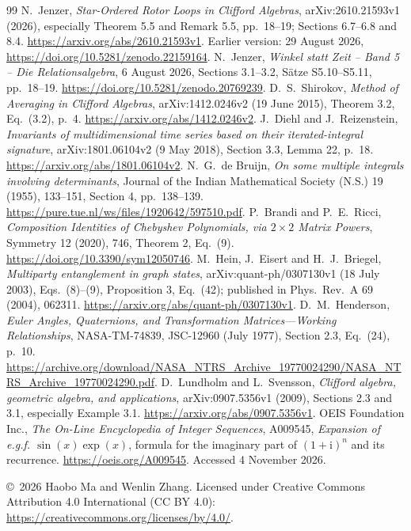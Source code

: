 \documentclass[11pt]{article}
\begin{document}
\begin{thebibliography}{99}\small
{} N.~Jenzer, \emph{Star-Ordered Rotor Loops in Clifford
Algebras}, arXiv:2610.21593v1 (2026), especially Theorem 5.5 and
Remark 5.5, pp.~18--19; Sections 6.7--6.8 and 8.4.
\url{https://arxiv.org/abs/2610.21593v1}. Earlier version:
29 August 2026, \url{https://doi.org/10.5281/zenodo.22159164}.
 N.~Jenzer, \emph{Winkel statt Zeit -- Band 5 --
Die Relationsalgebra}, 6 August 2026, Sections 3.1--3.2,
S\"atze S5.10--S5.11, pp.~18--19.
\url{https://doi.org/10.5281/zenodo.20769239}.
 D.~S.~Shirokov, \emph{Method of Averaging in Clifford
Algebras}, arXiv:1412.0246v2 (19 June 2015), Theorem 3.2, Eq.~(3.2), p.~4.
\url{https://arxiv.org/abs/1412.0246v2}.
 J.~Diehl and J.~Reizenstein, \emph{Invariants of multidimensional
time series based on their iterated-integral signature}, arXiv:1801.06104v2
(9 May 2018), Section 3.3, Lemma 22, p.~18.
\url{https://arxiv.org/abs/1801.06104v2}.
 N.~G.~de Bruijn, \emph{On some multiple integrals involving
determinants}, Journal of the Indian Mathematical Society (N.S.) 19
(1955), 133--151, Section 4, pp.~138--139.
\url{https://pure.tue.nl/ws/files/1920642/597510.pdf}.
 P.~Brandi and P.~E.~Ricci, \emph{Composition Identities of
Chebyshev Polynomials, via $2\times2$ Matrix Powers}, Symmetry 12 (2020),
746, Theorem 2, Eq.~(9).
\url{https://doi.org/10.3390/sym12050746}.
 M.~Hein, J.~Eisert and H.~J.~Briegel, \emph{Multiparty
entanglement in graph states}, arXiv:quant-ph/0307130v1 (18 July 2003),
Eqs.~(8)--(9), Proposition 3, Eq.~(42); published in Phys.~Rev.~A 69
(2004), 062311. \url{https://arxiv.org/abs/quant-ph/0307130v1}.
 D.~M.~Henderson, \emph{Euler Angles, Quaternions, and
Transformation Matrices---Working Relationships}, NASA-TM-74839,
JSC-12960 (July 1977), Section 2.3, Eq.~(24), p.~10.
\url{https://archive.org/download/NASA_NTRS_Archive_19770024290/NASA_NTRS_Archive_19770024290.pdf}.
 D.~Lundholm and L.~Svensson, \emph{Clifford algebra, geometric
algebra, and applications}, arXiv:0907.5356v1 (2009), Sections 2.3 and 3.1,
especially Example 3.1. \url{https://arxiv.org/abs/0907.5356v1}.
 OEIS Foundation Inc., \emph{The On-Line Encyclopedia of
Integer Sequences}, A009545, \emph{Expansion of e.g.f. $\sin(x)\exp(x)$},
formula for the imaginary part of $(1+\mathrm i)^n$ and its recurrence.
\url{https://oeis.org/A009545}. Accessed 4 November 2026.
\end{thebibliography}
\smallskip\noindent\small
\copyright\ 2026 Haobo Ma and Wenlin Zhang. Licensed under Creative
Commons Attribution 4.0 International (CC BY 4.0):
\url{https://creativecommons.org/licenses/by/4.0/}.
\end{document}
